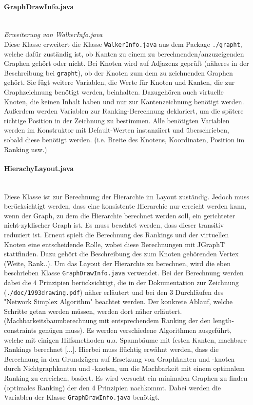 \documentclass[10pt,a4paper]{article}
\begin{document}
\paragraph{GraphDrawInfo.java}\ \\
\emph{Erweiterung von WalkerInfo.java}\\
{\footnotesize Diese Klasse erweitert die Klasse \texttt{WalkerInfo.java} aus dem Package \texttt{./grapht}, welche dafür zuständig ist, ob Kanten zu einem zu berechnenden/anzuzeigenden Graphen gehört oder nicht. Bei Knoten wird auf Adjazenz geprüft (näheres in der Beschreibung bei \texttt{grapht}), ob der Knoten zum dem zu zeichnenden Graphen gehört. Sie fügt weitere Variablen, die Werte für Knoten und Kanten, die zur Graphzeichnung benötigt werden, beinhalten. Dazugehören auch virtuelle Knoten, die keinen Inhalt haben und nur zur Kantenzeichnung benötigt werden. Außerdem werden Variablen zur Ranking-Berechnung deklariert, um die spätere richtige Position in der Zeichnung zu bestimmen. Alle benötigten Variablen werden im Konstruktor mit Default-Werten instanziiert und überschrieben, sobald diese benötigt werden. (i.e. Breite des Knotens, Koordinaten, Position im Ranking usw.)}

\paragraph{HierachyLayout.java}\ \\
{\footnotesize Diese Klasse ist zur Berechnung der Hierarchie im Layout zuständig. Jedoch muss berücksichtigt werden, dass eine konsistente Hierarchie nur erreicht werden kann, wenn der Graph, zu dem die Hierarchie berechnet werden soll, ein gerichteter nicht-zyklischer Graph ist. Es muss beachtet werden, dass dieser transitiv reduziert ist. Erneut spielt die Berechnung des Rankings und der virtuellen Knoten eine entscheidende Rolle, wobei diese Berechnungen mit JGraphT stattfinden. Dazu gehört die Beschreibung des zum Knoten gehörenden Vertex (Weite, Rank..). Um das Layout der Hierarchie zu berechnen, wird die eben beschrieben Klasse \texttt{GraphDrawInfo.java} verwendet. Bei der Berechnung werden dabei die 4 Prinzipien berücksichtigt, die in der Dokumentation zur Zeichnung (\texttt{./doc/1993drawing.pdf}) näher erläutert und bei den 3 Durchläufen des "Network Simplex Algorithm" beachtet werden. Der konkrete Ablauf, welche Schritte getan werden müssen, werden dort näher erläutert. (Machbarkeitsbaumberechnung mit entsprechendem Ranking der den length-constraints genügen muss).  Es werden verschiedene Algorithmen ausgeführt, welche mit einigen Hilfsmethoden u.a. Spannbäume mit festen Kanten, machbare Rankings berechnet [...]. Hierbei muss flüchtig erwähnt werden, dass die Berechnung in den Grundzügen auf Ersetzung von Graphkanten und -knoten durch Nichtgraphkanten und -knoten, um die Machbarkeit mit einem optimalem Ranking zu erreichen, basiert. Es wird versucht ein minimalen Graphen zu finden (optimales Ranking) der den 4 Prinzipien nachkommt. Dabei werden die Variablen der Klasse \texttt{GraphDrawInfo.java} benötigt.} 
\end{document}
